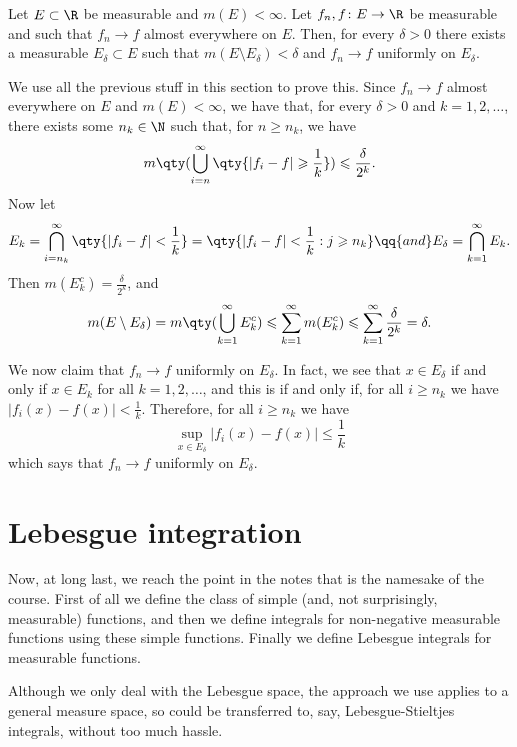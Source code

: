 \documentclass{maths}
\begin{document}
\begin{thm}
    Let $E\subset\R$ be measurable and $m(E)<\infty$.
    Let $f_n,f\colon E\to\R$ be measurable and such that $f_n\to f$ almost everywhere on $E$.
    Then, for every $\delta>0$ there exists a measurable $E_{\delta}\subset E$ such that $m(E\setminus E_{\delta})<\delta$ and $f_n\to f$ uniformly on $E_{\delta}$.
\end{thm}

\begin{prf}
    We use all the previous stuff in this section to prove this.
    Since $f_n\to f$ almost everywhere on $E$ and $m(E)<\infty$, we have that, for every $\delta>0$ and $k=1,2,\ldots$, there exists some $n_k\in\N$ such that, for $n\geqslant n_k$, we have
    \[
        m\qty(\bigcup_{i=n}^{\infty} \qty{|f_i - f| \geqslant \frac{1}{k}}) \leqslant
        \frac{\delta}{2^k}.
    \]
    Now let
    \[
        E_k =
        \bigcap_{i=n_k}^{\infty} \qty{|f_i - f| < \frac{1}{k}} =
        \qty{|f_i - f| < \frac{1}{k} : j\geqslant n_k}
        \qq{and}
        E_{\delta} =
        \bigcap_{k=1}^{\infty} E_k.
    \]
    Then $m(E_k^c)=\frac{\delta}{2^k}$, and
    \[
        m(E\setminus E_{\delta}) =
        m\qty(\bigcup_{k=1}^{\infty} E_k^c) \leqslant
        \sum_{k=1}^{\infty} m(E_k^c) \leqslant
        \sum_{k=1}^{\infty} \frac{\delta}{2^k} =
        \delta.
    \]

    We now claim that $f_n\to f$ uniformly on $E_{\delta}$.
    In fact, we see that $x\in E_{\delta}$ if and only if $x\in E_k$ for all $k=1,2,\ldots$, and this is if and only if, for all $i\geqslant n_k$ we have $|f_i(x) - f(x)| < \frac{1}{k}$.
    Therefore, for all $i\geqslant n_k$ we have
    \[
        \sup_{x\in E_{\delta}} |f_i(x) - f(x)| \leqslant \frac{1}{k}
    \]
    which says that $f_n\to f$ uniformly on $E_{\delta}$.
\end{prf}

\section{Lebesgue integration}

Now, at long last, we reach the point in the notes that is the namesake of the course.
First of all we define the class of simple (and, not surprisingly, measurable) functions, and then we define integrals for non-negative measurable functions using these simple functions.
Finally we define Lebesgue integrals for measurable functions.

Although we only deal with the Lebesgue space, the approach we use applies to a general measure space, so could be transferred to, say, Lebesgue-Stieltjes integrals, without too much hassle.
\end{document}
